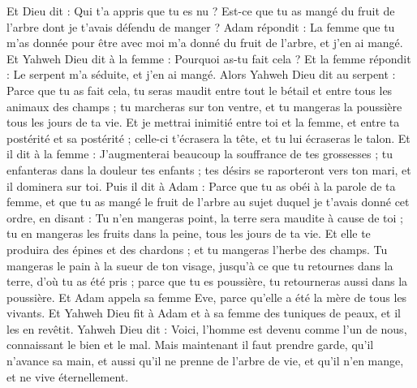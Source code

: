 \begin{multicols}{2}
Et Dieu dit : Qui t'a appris que tu es nu ? Est-ce que tu as mangé du fruit de l'arbre dont je t'avais défendu de manger ?
Adam répondit : La femme que tu m'as donnée pour être avec moi m'a donné du fruit de l'arbre, et j'en ai mangé.
Et Yahweh Dieu dit à la femme : Pourquoi as-tu fait cela ? Et la femme répondit : Le serpent m'a séduite, et j'en ai mangé.
Alors Yahweh Dieu dit au serpent : Parce que tu as fait cela, tu seras maudit entre tout le bétail et entre tous les animaux des champs ; tu marcheras sur ton ventre, et tu mangeras la poussière tous les jours de ta vie.
Et je mettrai inimitié entre toi et la femme, et entre ta postérité et sa postérité ; celle-ci t'écrasera la tête, et tu lui écraseras le talon.
Et il dit à la femme : J'augmenterai beaucoup la souffrance de tes grossesses ; tu enfanteras dans la douleur tes enfants ; tes désirs se raporteront vers ton mari, et il dominera sur toi.
Puis il dit à Adam : Parce que tu as obéi à la parole de ta femme, et que tu as mangé le fruit de l'arbre au sujet duquel je t'avais donné cet ordre, en disant : Tu n'en mangeras point, la terre sera maudite à cause de toi ; tu en mangeras les fruits dans la peine, tous les jours de ta vie.
Et elle te produira des épines et des chardons ; et tu mangeras l'herbe des champs.
Tu mangeras le pain à la sueur de ton visage, jusqu'à ce que tu retournes dans la terre, d'où tu as été pris ; parce que tu es poussière, tu retourneras aussi dans la poussière. 
Et Adam appela sa femme Eve, parce qu'elle a été la mère de tous les vivants.
Et Yahweh Dieu fit à Adam et à sa femme des tuniques de peaux, et il les en revêtit.
Yahweh Dieu dit : Voici, l'homme est devenu comme l'un de nous, connaissant le bien et le mal. Mais maintenant il faut prendre garde, qu'il n'avance sa main, et aussi qu'il ne prenne de l'arbre de vie, et qu'il n'en mange, et ne vive éternellement.

\end{multicols}
